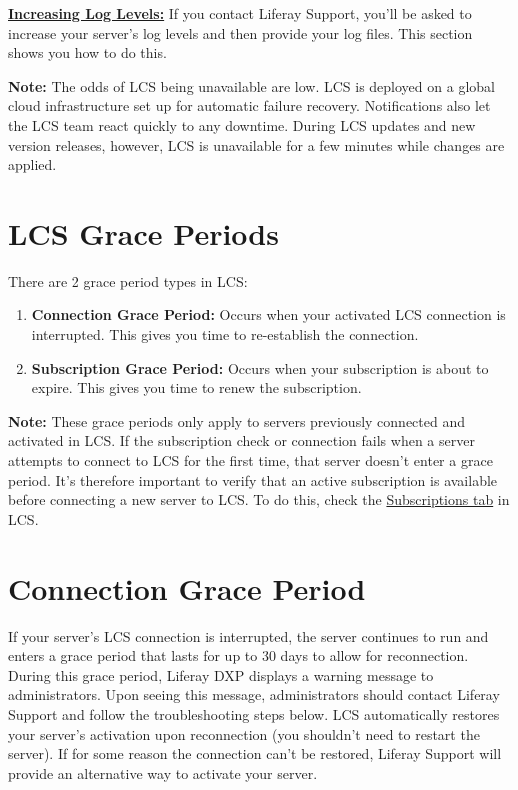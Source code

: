 \hyperref[increasing-log-levels]{\textbf{Increasing Log Levels:}} If you
contact Liferay Support, you'll be asked to increase your server's log
levels and then provide your log files. This section shows you how to do
this.

\noindent\hrulefill

\textbf{Note:} The odds of LCS being unavailable are low. LCS is
deployed on a global cloud infrastructure set up for automatic failure
recovery. Notifications also let the LCS team react quickly to any
downtime. During LCS updates and new version releases, however, LCS is
unavailable for a few minutes while changes are applied.

\noindent\hrulefill

\section{LCS Grace Periods}\label{lcs-grace-periods}

There are 2 grace period types in LCS:

\begin{enumerate}
\def\labelenumi{\arabic{enumi}.}
\item
  \textbf{Connection Grace Period:} Occurs when your activated LCS
  connection is interrupted. This gives you time to re-establish the
  connection.
\item
  \textbf{Subscription Grace Period:} Occurs when your subscription is
  about to expire. This gives you time to renew the subscription.
\end{enumerate}

\noindent\hrulefill

\textbf{Note:} These grace periods only apply to servers previously
connected and activated in LCS. If the subscription check or connection
fails when a server attempts to connect to LCS for the first time, that
server doesn't enter a grace period. It's therefore important to verify
that an active subscription is available before connecting a new server
to LCS. To do this, check the
\href{/docs/7-2/deploy/-/knowledge_base/d/managing-liferay-dxp-subscriptions}{Subscriptions
tab} in LCS.

\noindent\hrulefill

\section{Connection Grace Period}\label{connection-grace-period}

If your server's LCS connection is interrupted, the server continues to
run and enters a grace period that lasts for up to 30 days to allow for
reconnection. During this grace period, Liferay DXP displays a warning
message to administrators. Upon seeing this message, administrators
should contact Liferay Support and follow the troubleshooting steps
below. LCS automatically restores your server's activation upon
reconnection (you shouldn't need to restart the server). If for some
reason the connection can't be restored, Liferay Support will provide an
alternative way to activate your server.

